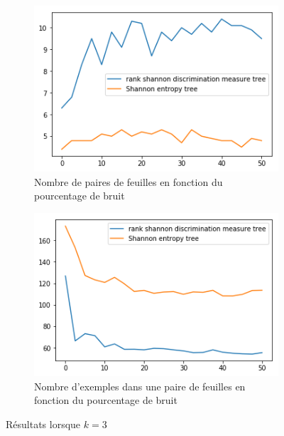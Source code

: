 \documentclass[a4paper]{article}
\begin{document}
\begin{figure}[H]
    \begin{subfigure}[c]{0.46\textwidth}
        \centering
        \includegraphics[width=\textwidth]{images/nbpairs_3.png}
        \caption{Nombre de paires de feuilles en fonction du pourcentage de bruit}
    \end{subfigure}
    \begin{subfigure}[c]{0.46\textwidth}
        \centering
        \includegraphics[width=\textwidth]{images/nbexamples_3.png}
        \caption{Nombre d'exemples dans une paire de feuilles en fonction du pourcentage de bruit}
    \end{subfigure}

    \caption{Résultats lorsque $k=3$}
    \label{results:artificial3}
\end{figure}
\end{document}

